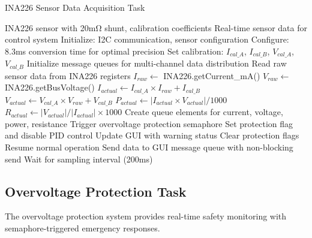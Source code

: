 \documentclass{article}
\begin{document}
\begin{algorithm}
\caption{INA226 Sensor Data Acquisition Task}
\label{alg:ina226_sensor}
\begin{algorithmic}[1]
\REQUIRE INA226 sensor with 20mΩ shunt, calibration coefficients
\ENSURE Real-time sensor data for control system
\STATE Initialize: I2C communication, sensor configuration
\STATE Configure: 8.3ms conversion time for optimal precision
\STATE Set calibration: $I_{cal\_A}$, $I_{cal\_B}$, $V_{cal\_A}$, $V_{cal\_B}$
\STATE Initialize message queues for multi-channel data distribution
    \STATE Read raw sensor data from INA226 registers
    \STATE $I_{raw} \leftarrow$ INA226.getCurrent\_mA()
    \STATE $V_{raw} \leftarrow$ INA226.getBusVoltage()
    \STATE {}
    \STATE $I_{actual} \leftarrow I_{cal\_A} \times I_{raw} + I_{cal\_B}$
    \STATE $V_{actual} \leftarrow V_{cal\_A} \times V_{raw} + V_{cal\_B}$
    \STATE $P_{actual} \leftarrow |I_{actual} \times V_{actual}| / 1000$
    \STATE $R_{actual} \leftarrow |V_{actual}| / |I_{actual}| \times 1000$
    \STATE {}
    \STATE Create queue elements for current, voltage, power, resistance
    \STATE {}
        \STATE Trigger overvoltage protection semaphore
        \STATE Set protection flag and disable PID control
        \STATE Update GUI with warning status
    \ELSE
        \STATE Clear protection flags
        \STATE Resume normal operation
    \ENDIF
    \STATE Send data to GUI message queue with non-blocking send
    \STATE Wait for sampling interval (200ms)
\ENDWHILE
\end{algorithmic}
\end{algorithm}

\subsection{Overvoltage Protection Task}

The overvoltage protection system provides real-time safety monitoring with semaphore-triggered emergency responses.
\end{document}
